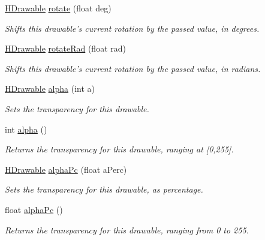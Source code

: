 \begin{DoxyCompactItemize}
\item 
\hyperlink{classhype_1_1core_1_1drawable_1_1_h_drawable}{H\-Drawable} \hyperlink{classhype_1_1core_1_1drawable_1_1_h_drawable_a70b50dc6d7d6f41db1581658cb01c0e1}{rotate} (float deg)
\begin{DoxyCompactList}\small\item\em Shifts this drawable's current rotation by the passed value, in degrees. \end{DoxyCompactList}\item 
\hyperlink{classhype_1_1core_1_1drawable_1_1_h_drawable}{H\-Drawable} \hyperlink{classhype_1_1core_1_1drawable_1_1_h_drawable_aea2c7f8c537f94274afe8219a8dd79bf}{rotate\-Rad} (float rad)
\begin{DoxyCompactList}\small\item\em Shifts this drawable's current rotation by the passed value, in radians. \end{DoxyCompactList}\item 
\hyperlink{classhype_1_1core_1_1drawable_1_1_h_drawable}{H\-Drawable} \hyperlink{classhype_1_1core_1_1drawable_1_1_h_drawable_ae0711e3bde7279c84b0282f928bbe699}{alpha} (int a)
\begin{DoxyCompactList}\small\item\em Sets the transparency for this drawable. \end{DoxyCompactList}\item 
int \hyperlink{classhype_1_1core_1_1drawable_1_1_h_drawable_ab3b43c250064df54b92a6939bddd0b43}{alpha} ()
\begin{DoxyCompactList}\small\item\em Returns the transparency for this drawable, ranging at {\ttfamily \mbox{[}0,255\mbox{]}}. \end{DoxyCompactList}\item 
\hyperlink{classhype_1_1core_1_1drawable_1_1_h_drawable}{H\-Drawable} \hyperlink{classhype_1_1core_1_1drawable_1_1_h_drawable_ab71ad420ba6d4a5eb981296684033d74}{alpha\-Pc} (float a\-Perc)
\begin{DoxyCompactList}\small\item\em Sets the transparency for this drawable, as percentage. \end{DoxyCompactList}\item 
float \hyperlink{classhype_1_1core_1_1drawable_1_1_h_drawable_a3be1ca0802560e21622875604b0da0ff}{alpha\-Pc} ()
\begin{DoxyCompactList}\small\item\em Returns the transparency for this drawable, ranging from 0 to 255. \end{DoxyCompactList}\item 

\end{DoxyCompactItemize}
